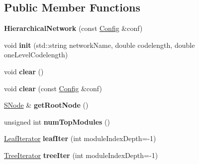 \subsection*{Public Member Functions}
\begin{DoxyCompactItemize}
\item 
\mbox{\label{classHierarchicalNetwork_ad944688007b6ebd216d4bca7494a05fb}} 
{\bfseries Hierarchical\+Network} (const \mbox{\hyperlink{structConfig}{Config}} \&conf)
\item 
\mbox{\label{classHierarchicalNetwork_a18f7a5cf2299c46cc4a9f4323966ee98}} 
void {\bfseries init} (std\+::string network\+Name, double codelength, double one\+Level\+Codelength)
\item 
\mbox{\label{classHierarchicalNetwork_a9207ca47e8361ebd4f4955073f78c6c5}} 
void {\bfseries clear} ()
\item 
\mbox{\label{classHierarchicalNetwork_a915fe3f5addf08c3a7363edf4c8ce9f5}} 
void {\bfseries clear} (const \mbox{\hyperlink{structConfig}{Config}} \&conf)
\item 
\mbox{\label{classHierarchicalNetwork_a50bfc6056358ff96c794b77cf9d724c5}} 
\mbox{\hyperlink{classSNode}{S\+Node}} \& {\bfseries get\+Root\+Node} ()
\item 
\mbox{\label{classHierarchicalNetwork_a75bfb172ffec8befd3296c710c00b65c}} 
unsigned int {\bfseries num\+Top\+Modules} ()
\item 
\mbox{\label{classHierarchicalNetwork_a024be14e77865ee1052d05133675ed68}} 
\mbox{\hyperlink{classLeafIterator}{Leaf\+Iterator}} {\bfseries leaf\+Iter} (int module\+Index\+Depth=-\/1)
\item 
\mbox{\label{classHierarchicalNetwork_a83c7dcc316ceb7a32d8080cdaa2ccd3b}} 
\mbox{\hyperlink{classTreeIterator}{Tree\+Iterator}} {\bfseries tree\+Iter} (int module\+Index\+Depth=-\/1)
\item 
\mbox{\label{classHierarchicalNetwork_a53b2c2fe076062d335a7c9908810c527}} 

\end{DoxyCompactItemize}
